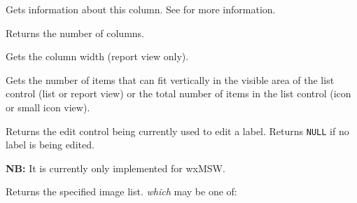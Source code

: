 \label{wxlistctrlgetcolumn}


Gets information about this column. See  for more
information.



\label{wxlistctrlgetcolumncount}


Returns the number of columns.


\label{wxlistctrlgetcolumnwidth}


Gets the column width (report view only).


\label{wxlistctrlgetcountperpage}


Gets the number of items that can fit vertically in the
visible area of the list control (list or report view)
or the total number of items in the list control (icon
or small icon view).


\label{wxlistctrlgeteditcontrol}


Returns the edit control being currently used to edit a label. Returns {\tt NULL}
if no label is being edited.

{\bf NB:} It is currently only implemented for wxMSW.


\label{wxlistctrlgetimagelist}


Returns the specified image list. {\it which} may be one of:

\twocolwidtha{5cm}
\begin{twocollist}\itemsep=0pt
\end{twocollist}


